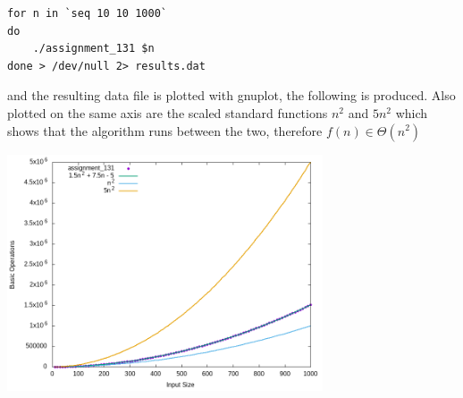 \documentclass[11pt]{article}
\begin{document}
\begin{Verbatim}
for n in `seq 10 10 1000`
do
    ./assignment_131 $n
done > /dev/null 2> results.dat
\end{Verbatim}

and the resulting data file is plotted with gnuplot, the following is
produced. Also plotted on the same axis are the scaled standard
functions $n^2$ and $5n^2$ which shows that the algorithm runs between the two, therefore $f(n) \in \Theta(n^{2})$

\begin{center}
\includegraphics[width=0.7\textwidth]{problem_4.png}
\end{center} 
\end{document}
